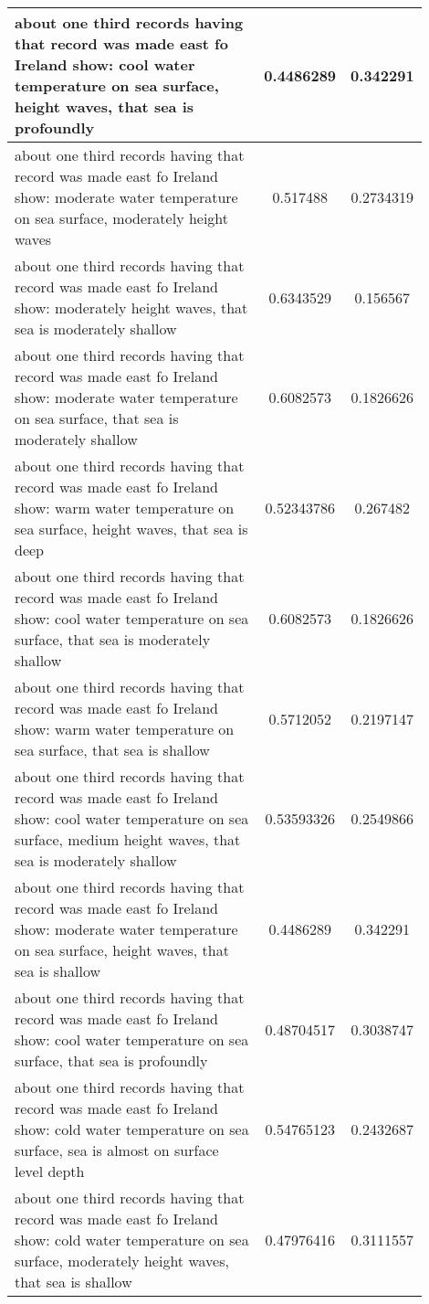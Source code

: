 \documentclass{article}
\begin{document}
\begin{longtable}{|p{0.9\linewidth}|c|c|}
about one third records having that record was made east fo Ireland show: cool water temperature on sea surface, height waves, that sea is profoundly & 0.4486289 & 0.342291 \\ \hline
about one third records having that record was made east fo Ireland show: moderate water temperature on sea surface, moderately height waves & 0.517488 & 0.2734319 \\ \hline
about one third records having that record was made east fo Ireland show: moderately height waves, that sea is moderately shallow & 0.6343529 & 0.156567 \\ \hline
about one third records having that record was made east fo Ireland show: moderate water temperature on sea surface, that sea is moderately shallow & 0.6082573 & 0.1826626 \\ \hline
about one third records having that record was made east fo Ireland show: warm water temperature on sea surface, height waves, that sea is deep & 0.52343786 & 0.267482 \\ \hline
about one third records having that record was made east fo Ireland show: cool water temperature on sea surface, that sea is moderately shallow & 0.6082573 & 0.1826626 \\ \hline
about one third records having that record was made east fo Ireland show: warm water temperature on sea surface, that sea is shallow & 0.5712052 & 0.2197147 \\ \hline
about one third records having that record was made east fo Ireland show: cool water temperature on sea surface, medium height waves, that sea is moderately shallow & 0.53593326 & 0.2549866 \\ \hline
about one third records having that record was made east fo Ireland show: moderate water temperature on sea surface, height waves, that sea is shallow & 0.4486289 & 0.342291 \\ \hline
about one third records having that record was made east fo Ireland show: cool water temperature on sea surface, that sea is profoundly & 0.48704517 & 0.3038747 \\ \hline
about one third records having that record was made east fo Ireland show: cold water temperature on sea surface, sea is almost on surface level depth & 0.54765123 & 0.2432687 \\ \hline
about one third records having that record was made east fo Ireland show: cold water temperature on sea surface, moderately height waves, that sea is shallow & 0.47976416 & 0.3111557 \\ \hline

\end{longtable}
\end{document}
